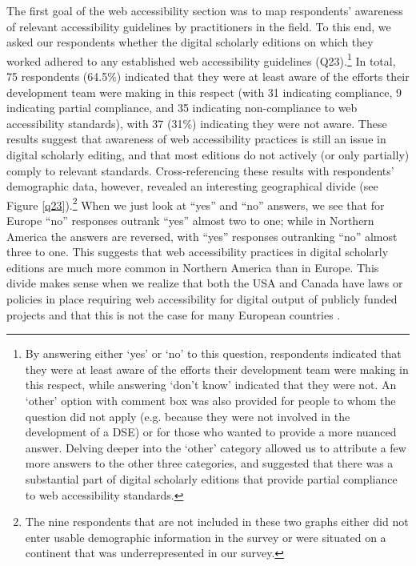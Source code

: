 \begin{paper}
The first goal of the web accessibility section was to map respondents'
awareness of relevant accessibility guidelines by practitioners in the
field. To this end, we asked our respondents whether the digital
scholarly editions on which they worked adhered to any established web
accessibility guidelines (Q23).\footnote{By answering either `yes' or
  `no' to this question, respondents indicated that they were at least
  aware of the efforts their development team were making in this
  respect, while answering `don't know' indicated that they were not. An
  `other' option with comment box was also provided for people to whom
  the question did not apply (e.g. because they were not involved in the
  development of a DSE) or for those who wanted to provide a more
  nuanced answer. Delving deeper into the `other' category allowed us to
  attribute a few more answers to the other three categories, and
  suggested that there was a substantial part of digital scholarly
  editions that provide partial compliance to web accessibility
  standards.} In total, 75 respondents (64.5\%) indicated that they were
at least aware of the efforts their development team were making in this
respect (with 31 indicating compliance, 9 indicating partial compliance,
and 35 indicating non-compliance to web accessibility standards), with
37 (31\%) indicating they were not aware. These results suggest that
awareness of web accessibility practices is still an issue in digital
scholarly editing, and that most editions do not actively (or only
partially) comply to relevant standards. Cross-referencing these results
with respondents' demographic data, however, revealed an interesting
geographical divide (see Figure \ref{q23}).\footnote{The nine respondents that are not included in these two graphs either did not enter usable demographic information in the survey or were situated on a continent that was underrepresented in our survey.} When we just look at ``yes'' and
``no'' answers, we see that for Europe ``no'' responses outrank ``yes''
almost two to one; while in Northern America the answers are reversed,
with ``yes'' responses outranking ``no'' almost three to one. This
suggests that web accessibility practices in digital scholarly editions
are much more common in Northern America than in Europe. This divide
makes sense when we realize that both the USA and Canada have laws or
policies in place requiring web accessibility for digital output of
publicly funded projects and that this is not the case for many European
countries \citep[205]{williams_disability_2012}.


\end{paper}
